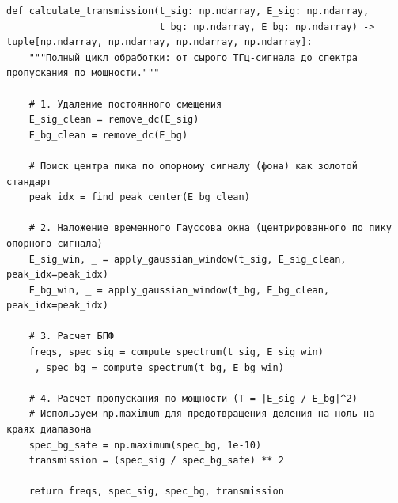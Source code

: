 \begin{listing}[H]
	\caption{Конвейер расчета спектра пропускания (spectrum.py)}
	\begin{verbatim}
def calculate_transmission(t_sig: np.ndarray, E_sig: np.ndarray, 
                           t_bg: np.ndarray, E_bg: np.ndarray) -> tuple[np.ndarray, np.ndarray, np.ndarray, np.ndarray]:
    """Полный цикл обработки: от сырого ТГц-сигнала до спектра пропускания по мощности."""
    
    # 1. Удаление постоянного смещения
    E_sig_clean = remove_dc(E_sig)
    E_bg_clean = remove_dc(E_bg)
    
    # Поиск центра пика по опорному сигналу (фона) как золотой стандарт
    peak_idx = find_peak_center(E_bg_clean)
    
    # 2. Наложение временного Гауссова окна (центрированного по пику опорного сигнала)
    E_sig_win, _ = apply_gaussian_window(t_sig, E_sig_clean, peak_idx=peak_idx)
    E_bg_win, _ = apply_gaussian_window(t_bg, E_bg_clean, peak_idx=peak_idx)
    
    # 3. Расчет БПФ
    freqs, spec_sig = compute_spectrum(t_sig, E_sig_win)
    _, spec_bg = compute_spectrum(t_bg, E_bg_win)
    
    # 4. Расчет пропускания по мощности (T = |E_sig / E_bg|^2)
    # Используем np.maximum для предотвращения деления на ноль на краях диапазона
    spec_bg_safe = np.maximum(spec_bg, 1e-10)
    transmission = (spec_sig / spec_bg_safe) ** 2
    
    return freqs, spec_sig, spec_bg, transmission
	\end{verbatim}
\end{listing}



